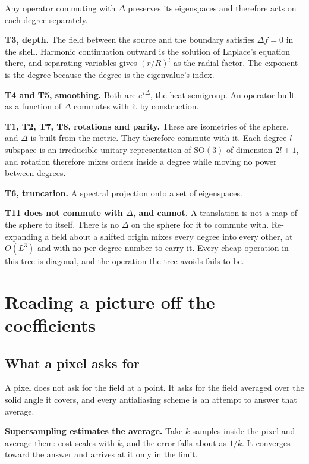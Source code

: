 Any operator commuting with \(\Delta\) preserves its eigenspaces and therefore acts on each degree separately.

\textbf{T3, depth.} The field between the source and the boundary satisfies \(\Delta f = 0\) in the shell. Harmonic continuation outward is the solution of Laplace's equation there, and separating variables gives \((r/R)^l\) as the radial factor. The exponent is the degree because the degree is the eigenvalue's index.

\textbf{T4 and T5, smoothing.} Both are \(e^{\tau\Delta}\), the heat semigroup. An operator built as a function of \(\Delta\) commutes with it by construction.

\textbf{T1, T2, T7, T8, rotations and parity.} These are isometries of the sphere, and \(\Delta\) is built from the metric. They therefore commute with it. Each degree \(l\) subspace is an irreducible unitary representation of \(\mathrm{SO}(3)\) of dimension \(2l+1\), and rotation therefore mixes orders inside a degree while moving no power between degrees.

\textbf{T6, truncation.} A spectral projection onto a set of eigenspaces.

\textbf{T11 does not commute with \(\Delta\), and cannot.} A translation is not a map of the sphere to itself. There is no \(\Delta\) on the sphere for it to commute with. Re-expanding a field about a shifted origin mixes every degree into every other, at \(O(L^3)\) and with no per-degree number to carry it. Every cheap operation in this tree is diagonal, and the operation the tree avoids fails to be.

\section{Reading a picture off the coefficients}

\subsection{What a pixel asks for}

A pixel does not ask for the field at a point. It asks for the field averaged over the solid angle it covers, and every antialiasing scheme is an attempt to answer that average.

\textbf{Supersampling estimates the average.} Take \(k\) samples inside the pixel and average them: cost scales with \(k\), and the error falls about as \(1/k\). It converges toward the answer and arrives at it only in the limit.

